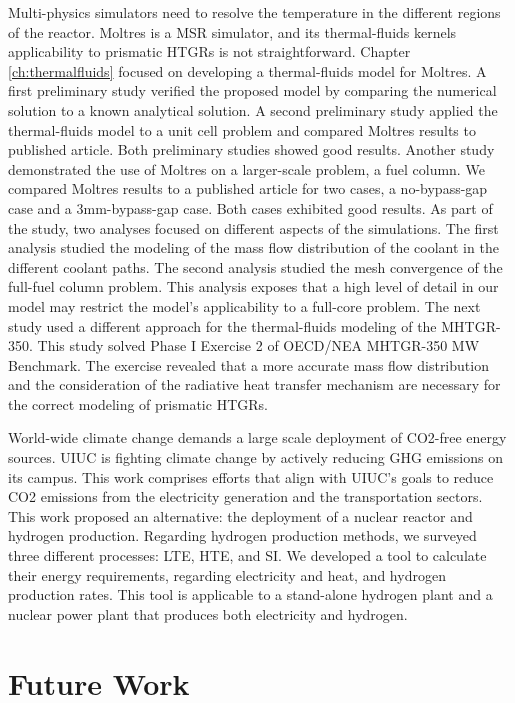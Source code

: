 Multi-physics simulators need to resolve the temperature in the different regions of the reactor.
Moltres is a MSR simulator, and its thermal-fluids kernels applicability to prismatic HTGRs is not straightforward.
Chapter \ref{ch:thermalfluids} focused on developing a thermal-fluids model for Moltres.
A first preliminary study verified the proposed model by comparing the numerical solution to a known analytical solution.
A second preliminary study applied the thermal-fluids model to a unit cell problem and compared Moltres results to published article.
Both preliminary studies showed good results.
Another study demonstrated the use of Moltres on a larger-scale problem, a fuel column.
We compared Moltres results to a published article for two cases, a no-bypass-gap case and a 3mm-bypass-gap case.
Both cases exhibited good results.
As part of the study, two analyses focused on different aspects of the simulations.
The first analysis studied the modeling of the mass flow distribution of the coolant in the different coolant paths.
The second analysis studied the mesh convergence of the full-fuel column problem.
This analysis exposes that a high level of detail in our model may restrict the model's applicability to a full-core problem.
The next study used a different approach for the thermal-fluids modeling of the MHTGR-350.
This study solved Phase I Exercise 2 of OECD/NEA MHTGR-350 MW Benchmark.
The exercise revealed that a more accurate mass flow distribution and the consideration of the radiative heat transfer mechanism are necessary for the correct modeling of prismatic HTGRs.

World-wide climate change demands a large scale deployment of \gls{CO2}-free energy sources.
UIUC is fighting climate change by actively reducing GHG emissions on its campus.
This work comprises efforts that align with UIUC's goals to reduce \gls{CO2} emissions from the electricity generation and the transportation sectors.
This work proposed an alternative: the deployment of a nuclear reactor and hydrogen production.
Regarding hydrogen production methods, we surveyed three different processes: LTE, HTE, and SI.
We developed a tool to calculate their energy requirements, regarding electricity and heat, and hydrogen production rates.
This tool is applicable to a stand-alone hydrogen plant and a nuclear power plant that produces both electricity and hydrogen.

\section{Future Work}

